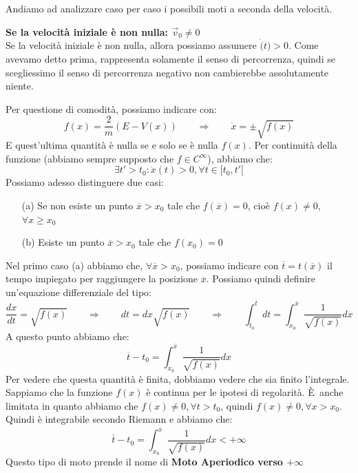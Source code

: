 \documentclass[11pt,a4paper,twoside]{article}
\theoremstyle{definition}
\begin{document}
Andiamo ad analizzare caso per caso i possibili moti a seconda della velocità.

\textbf{Se la velocità iniziale è non nulla: $\vec v_0 \neq 0$}\\
Se la velocità iniziale è non nulla, allora possiamo assumere $\dot (t)>0$. Come avevamo detto prima, rappresenta solamente il senso di percorrenza, quindi se scegliessimo il senso di percorrenza negativo non cambierebbe assolutamente niente.
\begin{center}
\end{center}
Per questione di comodità, possiamo indicare con:
\[ f(x) = \frac 2m (E-V(x))\qquad \Rightarrow \qquad \dot x = \pm \sqrt{f(x)} \]
E quest'ultima quantità è nulla se e solo se è nulla $f(x)$. Per continuità della funzione (abbiamo sempre supposto che $f \in C^\infty$), abbiamo che:
\[ \exists t'>t_0 : \dot x(t)>0, \forall t \in [t_0,t'[ \]
Possiamo adesso distinguere due casi:
\begin{itemize}
	\item[(a)] Se non esiste un punto $\overline x>x_0$ tale che $f(\overline x)=0$, cioè $f(x)\neq 0$, $\forall x\geq x_0$
	\item[(b)] Esiste un punto $\overline x>x_0$ tale che $f(x_0) = 0$
\end{itemize}

Nel primo caso (a) abbiamo che, $\forall \overline x>x_0$, possiamo indicare con $\overline t = t(\overline x)$ il tempo impiegato per raggiungere la posizione $\overline x$. Possiamo quindi definire un'equazione differenziale del tipo:
\[ \frac{dx}{dt} = \sqrt{f(x)} \qquad \Rightarrow \qquad dt = dx \sqrt{f(x)}\qquad \Rightarrow \qquad \int_{t_0}^{\overline t}dt = \int_{x_0}^{\overline x} \frac 1{\sqrt{f(x)}}dx \]
A questo punto abbiamo che:
\[ \overline t - t_0 = \int_{x_0}^{\overline x} \frac 1{\sqrt{f(x)}} dx \]
Per vedere che questa quantità è finita, dobbiamo vedere che sia finito l'integrale. Sappiamo che la funzione $f(x)$ è continua per le ipotesi di regolarità. È anche limitata in quanto abbiamo che $f(x)\neq 0, \forall t >t_0$, quindi $f(x)\neq 0, \forall x > x_0$.
Quindi è integrabile secondo Riemann e abbiamo che:
\[ \overline t-t_0 = \int_{x_0}^{\overline x} \frac1 {\sqrt{f(x)}}dx < + \infty \]
Questo tipo di moto prende il nome di \textbf{Moto Aperiodico verso $+\infty$}
\end{document}
